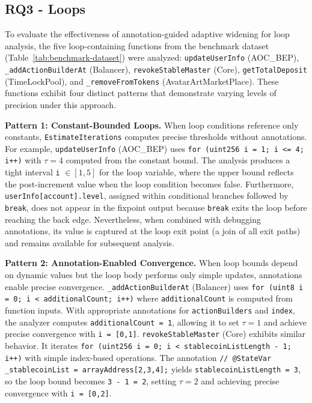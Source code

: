 \documentclass[pdflatex,sn-basic]{sn-jnl}%
\theoremstyle{thmstyleone}%
\theoremstyle{thmstyletwo}%
\theoremstyle{thmstylethree}%
\begin{document}
\subsection{RQ3 - Loops}

To evaluate the effectiveness of annotation-guided adaptive widening for loop analysis,
the five loop-containing functions from the benchmark dataset (Table~\ref{tab:benchmark-dataset}) were analyzed:
\texttt{updateUserInfo} (AOC\_BEP), \texttt{\_addActionBuilderAt} (Balancer), \texttt{revokeStableMaster} (Core), \texttt{getTotalDeposit} (TimeLockPool), and \texttt{\_removeFromTokens} (AvatarArtMarketPlace).
These functions exhibit four distinct patterns that demonstrate varying levels of precision under this approach.

\smallskip
\noindent\textbf{Pattern 1: Constant-Bounded Loops.}
When loop conditions reference only constants,
\texttt{EstimateIterations} computes precise thresholds without annotations.
For example, \texttt{updateUserInfo} (AOC\_BEP) uses \texttt{for (uint256 i = 1; i <= 4; i++)}
with $\tau = 4$ computed from the constant bound.
The analysis produces a tight interval \texttt{i} $\in [1,5]$ for the loop variable,
where the upper bound reflects the post-increment value when the loop condition becomes false.
Furthermore, \texttt{userInfo[account].level}, assigned within conditional branches followed by \texttt{break},
does not appear in the fixpoint output because \texttt{break} exits the loop before reaching the back edge.
Nevertheless, when combined with debugging annotations,
its value is captured at the loop exit point (a join of all exit paths) and remains available for subsequent analysis.

\smallskip
\noindent\textbf{Pattern 2: Annotation-Enabled Convergence.}
When loop bounds depend on dynamic values but the loop body performs only simple updates,
annotations enable precise convergence.
\texttt{\_addActionBuilderAt} (Balancer) uses \texttt{for (uint8 i = 0; i < additionalCount; i++)}
where \texttt{additionalCount} is computed from function inputs.
With appropriate annotations for \texttt{actionBuilders} and \texttt{index}, the analyzer computes \texttt{additionalCount = 1}, allowing it to set $\tau = 1$ and achieve precise convergence with \texttt{i = [0,1]}.
\texttt{revokeStableMaster} (Core) exhibits similar behavior.
It iterates \texttt{for (uint256 i = 0; i < stablecoinListLength - 1; i++)} with simple index-based operations.
The annotation \texttt{// @StateVar \_stablecoinList = arrayAddress[2,3,4];} yields \texttt{stablecoinListLength = 3}, so the loop bound becomes \texttt{3 - 1 = 2}, setting $\tau = 2$ and achieving precise convergence with \texttt{i = [0,2]}.
\end{document}
